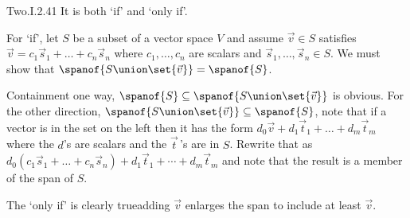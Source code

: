 \begin{ans}{Two.I.2.41}
      It is both `if' and `only if'.

      For `if',
      let \( S \) be a subset of a vector space \( V \) and assume
      \( \vec{v}\in S \) satisfies
      \( \vec{v}=c_1\vec{s}_1+\dots+c_n\vec{s}_n \) where
      \( c_1,\ldots,c_n \) are scalars and
      \( \vec{s}_1,\ldots,\vec{s}_n\in S \).
      We must show that \( \spanof{S\union\set{\vec{v}} }=\spanof{S} \).

      Containment one way,
      \( \spanof{S}\subseteq\spanof{S\union\set{\vec{v}} } \) is obvious.
      For the other direction,
      \( \spanof{S\union\set{\vec{v}} }\subseteq\spanof{S} \), note that if a
      vector is in the set on the left then it has the form
      \( d_0\vec{v}+d_1\vec{t}_1+\dots+d_m\vec{t}_m \) where the \( d \)'s are
      scalars and the \( \vec{t}\, \)'s are in \( S \).
      Rewrite that as
      \( d_0(c_1\vec{s}_1+\dots+c_n\vec{s}_n)
      +d_1\vec{t}_1+\cdots+d_m\vec{t}_m \) and note that
      the result is a member of the span of \( S \).

      The `only if' is clearly true\Dash adding \( \vec{v} \)
      enlarges the span to
      include at least \( \vec{v} \).
    
\end{ans}
